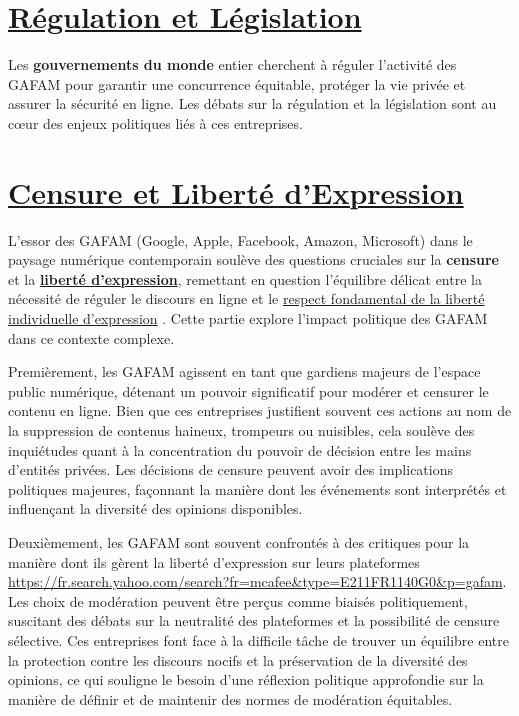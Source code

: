 \documentclass[12pt,a4paper]{article} %
\begin{document}
	\section{\underline{Régulation et Législation} }
	
	Les \textbf{gouvernements du monde} entier cherchent à réguler l'activité des GAFAM pour garantir une concurrence équitable, protéger la vie privée et assurer la sécurité en ligne. Les débats sur la régulation et la législation sont au cœur des enjeux politiques liés à ces entreprises.
	
	\section{\underline{Censure et Liberté d'Expression}}
	
	L'essor des GAFAM (Google, Apple, Facebook, Amazon, Microsoft) dans le paysage numérique contemporain soulève des questions cruciales sur la \textbf{censure} et la \textbf{\underline{liberté d'expression}}, remettant en question l'équilibre délicat entre la nécessité de réguler le discours en ligne et le \underline{respect fondamental de la liberté individuelle d'expression} . Cette partie explore l'impact politique des GAFAM dans ce contexte complexe.
	
	Premièrement, les GAFAM agissent en tant que gardiens majeurs de l'espace public numérique, détenant un pouvoir significatif pour modérer et censurer le contenu en ligne. Bien que ces entreprises justifient souvent ces actions au nom de la suppression de contenus haineux, trompeurs ou nuisibles, cela soulève des inquiétudes quant à la concentration du pouvoir de décision entre les mains d'entités privées. Les décisions de censure peuvent avoir des implications politiques majeures, façonnant la manière dont les événements sont interprétés et influençant la diversité des opinions disponibles.
	
	Deuxièmement, les GAFAM sont souvent confrontés à des critiques pour la manière dont ils gèrent la liberté d'expression sur leurs plateformes \url{https://fr.search.yahoo.com/search?fr=mcafee&type=E211FR1140G0&p=gafam}. Les choix de modération peuvent être perçus comme biaisés politiquement, suscitant des débats sur la neutralité des plateformes et la possibilité de censure sélective. Ces entreprises font face à la difficile tâche de trouver un équilibre entre la protection contre les discours nocifs et la préservation de la diversité des opinions, ce qui souligne le besoin d'une réflexion politique approfondie sur la manière de définir et de maintenir des normes de modération équitables.
	
\end{document}
